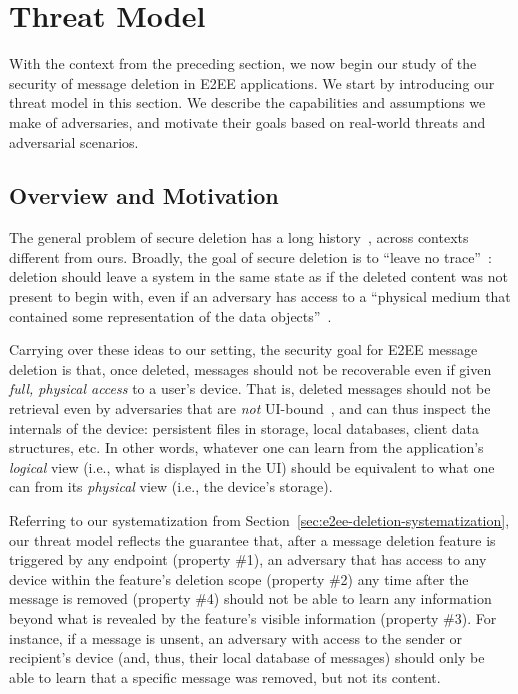 \section{Threat Model}\label{sec:threat-model}
With the context from the preceding section, we now begin our study of the security of message deletion in E2EE applications. We start by introducing our threat model in this section. We describe the capabilities and assumptions we make of adversaries, and motivate their goals based on real-world threats and adversarial scenarios. 

\subsection{Overview and Motivation}
The general problem of secure deletion has a long history~\cite{naor2001anti,reardon2013sok,garg2020formalizing,cohn2020delf}, across contexts different from ours. Broadly, the goal of secure deletion is to ``leave no trace''~\cite{garg2020formalizing}: deletion should leave a system in the same state as if the deleted content was not present to begin with, even if an adversary has access to a ``physical medium that contained some representation of the data objects''~\cite{reardon2013sok}.

Carrying over these ideas to our setting, the security goal for E2EE message deletion is that, once deleted, messages should not be recoverable even if given \emph{full, physical access} to a user's device. That is, deleted messages should not be retrieval even by adversaries that are \emph{not} UI-bound~\cite{freed2018stalker}, and can thus inspect the internals of the device: persistent files in storage, local databases, client data structures, etc. In other words, whatever one can learn from the application's \emph{logical} view (i.e., what is displayed in the UI) should be equivalent to what one can from its \emph{physical} view (i.e., the device's storage).

Referring to our systematization from Section~\ref{sec:e2ee-deletion-systematization}, our threat model reflects the guarantee that, after a message deletion feature is triggered by any endpoint (property \#1), an adversary that has access to any device within the feature's deletion scope (property \#2) any time after the message is removed (property \#4) should not be able to learn any information beyond what is revealed by the feature's visible information (property \#3). For instance, if a message is unsent, an adversary with access to the sender or recipient's device (and, thus, their local database of messages) should only be able to learn that a specific message was removed, but not its content.

